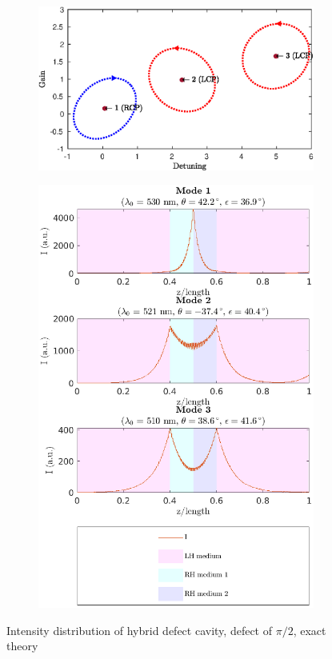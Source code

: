 \begin{figure}
	\centering
	\begin{subfigure}{\linewidth}
		\includegraphics[width=\linewidth]{plots/hybrid_defect/pi_2/modes_found_oseen}
		\caption{}
	\end{subfigure}
	\begin{subfigure}{\linewidth}
		\centering
		\includegraphics[height=0.5\textheight]{plots/hybrid_defect/pi_2/intensity_distribution_oseen}
		\caption{}
	\end{subfigure}
	\caption[Intensity distribution of hybrid defect cavity, defect of $\pi/2$, exact theory]{Intensity distribution of hybrid defect cavity, defect of $\pi/2$, exact theory}
	\label{fig:hybrid_defect_pi2_intensity_appendix}
\end{figure}
